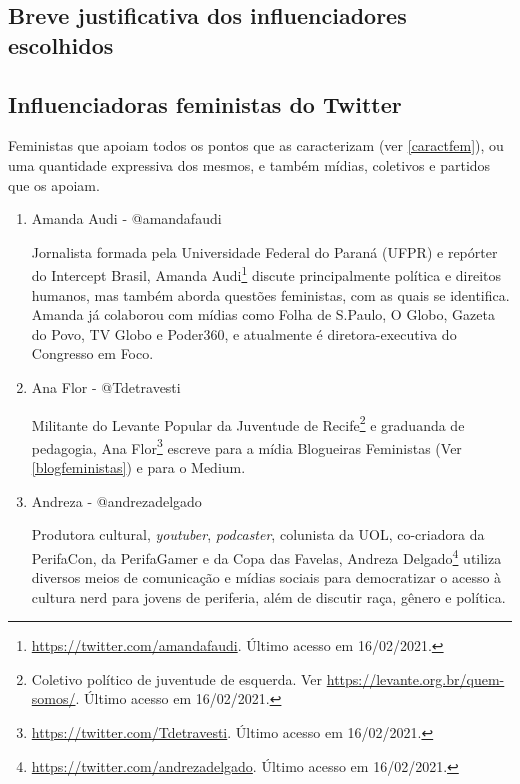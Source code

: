 \documentclass[
	12pt,				%
	openright,			%
	twoside,			%
	a4paper,			%
	english,			%
	brazil				%
	]{abntex2}
\begin{document}
 \begin{anexosenv}

 \partanexos

 \chapter{Breve justificativa dos influenciadores escolhidos}\label{justificativa}

 \section*{Influenciadoras feministas do Twitter}
 Feministas que apoiam todos os pontos que as caracterizam (ver \ref{caractfem}), ou uma quantidade expressiva dos mesmos, e também mídias, coletivos e partidos que os apoiam.
 
\begin{enumerate}

\subsection*{Pessoas públicas}

 \item Amanda Audi - @amandafaudi
 
 Jornalista formada pela Universidade Federal do Paraná (UFPR) e repórter do Intercept Brasil, Amanda Audi\footnote{\url{https://twitter.com/amandafaudi}. Último acesso em 16/02/2021.} discute principalmente política e direitos humanos, mas também aborda questões feministas, com as quais se identifica. Amanda já colaborou com mídias como Folha de S.Paulo, O Globo, Gazeta do Povo, TV Globo e Poder360, e atualmente é diretora-executiva do Congresso em Foco.

 \item Ana Flor - @Tdetravesti
 
 Militante do Levante Popular da Juventude de Recife\footnote{Coletivo político de juventude de esquerda. Ver \url{https://levante.org.br/quem-somos/}. Último acesso em 16/02/2021.} e graduanda de pedagogia, Ana Flor\footnote{\url{https://twitter.com/Tdetravesti}. Último acesso em 16/02/2021.} escreve para a mídia Blogueiras Feministas (Ver \ref{blogfeministas}) e para o Medium.
 
 \item Andreza - @andrezadelgado
 
 Produtora cultural, \textit{youtuber}, \textit{podcaster}, colunista da UOL, co-criadora da PerifaCon, da PerifaGamer e da Copa das Favelas, Andreza Delgado\footnote{\url{https://twitter.com/andrezadelgado}. Último acesso em 16/02/2021.} utiliza diversos meios de comunicação e mídias sociais para democratizar o acesso à cultura nerd para jovens de periferia, além de discutir raça, gênero e política.


\end{enumerate}
\end{anexosenv}
\end{document}
